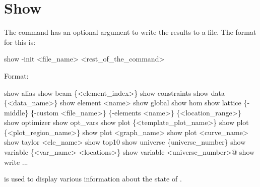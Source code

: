 \section{Show}
\label{s:show}

The  command has an optional argument to write the results to a file.
The format for this is:
\begin{example}
  show -init <file_name> <rest_of_the_command>
\end{example}

Format:
\begin{example}
  show alias 
  show beam \{<element_index>\}
  show constraints
  show data \{<data_name>\} 
  show element <name>
  show global
  show hom
  show lattice \{-middle\} \{-custom <file_name>\} \{-elements <name>\} \{<location_range>\}
  show optimizer
  show opt_vars
  show plot \{<template_plot_name>\}
  show plot \{<plot_region_name>\}
  show plot <graph_name>
  show plot <curve_name>
  show taylor <ele_name>
  show top10
  show universe \{universe_number\}
  show variable \{<var_name> <locations>\}
  show variable <universe_number>@
  show write ...
\end{example}

\vskip 0.2in 
 is used to display various information about
the state of \tao. 


